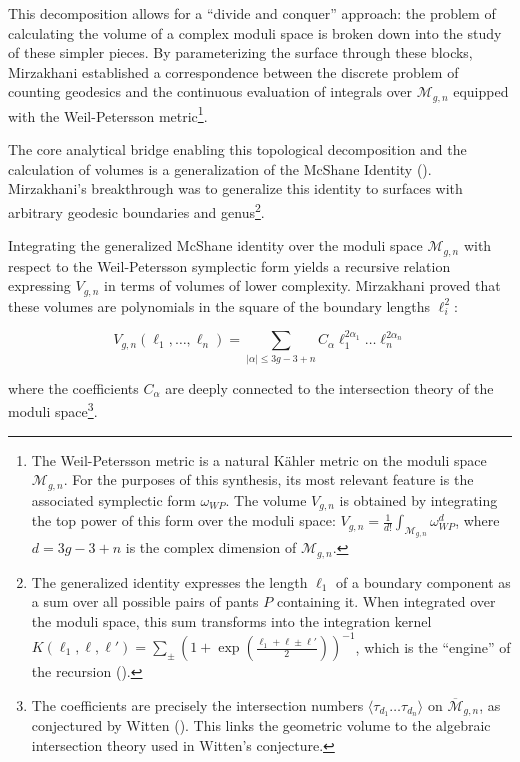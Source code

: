 This decomposition allows for a ``divide and conquer'' approach: the problem of calculating the volume of a complex moduli space is broken down into the study of these simpler pieces.
By parameterizing the surface through these blocks, Mirzakhani established a correspondence between the discrete problem of counting geodesics and the continuous evaluation of integrals over $\mathcal{M}_{g,n}$ equipped with the Weil-Petersson metric\footnote{The Weil-Petersson metric is a natural Kähler metric on the moduli space $\mathcal{M}_{g,n}$. For the purposes of this synthesis, its most relevant feature is the associated symplectic form $\omega_{WP}$. The volume $V_{g,n}$ is obtained by integrating the top power of this form over the moduli space: $V_{g,n} = \frac{1}{d!} \int_{\mathcal{M}_{g,n}} \omega_{WP}^d$, where $d = 3g-3+n$ is the complex dimension of $\mathcal{M}_{g,n}$.}. 

The core analytical bridge enabling this topological decomposition and the calculation of volumes is a generalization of the McShane Identity (\cite{McShane1998}). Mirzakhani's breakthrough was to generalize this identity to surfaces with arbitrary geodesic boundaries and genus\footnote{The generalized identity expresses the length $\ell_1$ of a boundary component as a sum over all possible pairs of pants $P$ containing it. When integrated over the moduli space, this sum transforms into the integration kernel $K(\ell_1, \ell, \ell') = \sum_{\pm} (1 + \exp(\frac{\ell_1 + \ell \pm \ell'}{2}))^{-1}$, which is the ``engine'' of the recursion (\cite{Mirzakhani2007b}).}.

Integrating the generalized McShane identity over the moduli space $\mathcal{M}_{g,n}$ with respect to the Weil-Petersson symplectic form yields a recursive relation expressing $V_{g,n}$ in terms of volumes of lower complexity. Mirzakhani proved that these volumes are polynomials in the square of the boundary lengths $\ell_i^2$:

\begin{equation}
V_{g,n}(\ell_1, \dots, \ell_n) = \sum_{|\alpha| \le 3g-3+n} C_{\alpha} \ell_1^{2\alpha_1} \dots \ell_n^{2\alpha_n}
\end{equation}

where the coefficients $C_{\alpha}$ are deeply connected to the intersection theory of the moduli space\footnote{The coefficients are precisely the intersection numbers $\langle \tau_{d_1} \dots \tau_{d_n} \rangle$ on $\overline{\mathcal{M}}_{g,n}$, as conjectured by Witten (\cite{Witten1991}). This links the geometric volume to the algebraic intersection theory used in Witten's conjecture.}.

